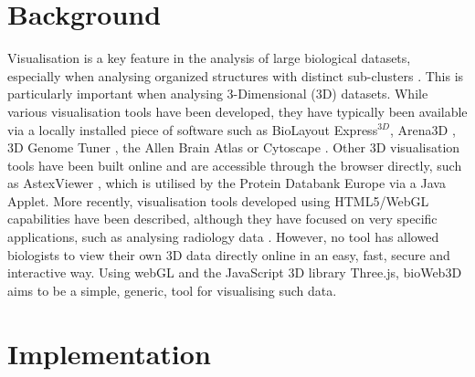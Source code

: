 \documentclass[10pt]{bmc_article}
\newenvironment{bmcformat}{\baselineskip20pt\sloppy\setboolean{publ}{false}}{\baselineskip20pt\sloppy}
\begin{document}
\begin{bmcformat}
\section{Background}

Visualisation is a key feature in the analysis of large biological datasets, especially when analysing organized structures with distinct sub-clusters \cite{Rubel10}. This is particularly important when analysing 3-Dimensional (3D) datasets. While various visualisation tools have been developed, they have typically been available via a locally installed piece of software such as BioLayout Express$^{3D}$\cite{Freeman07}, Arena3D \cite{Pavlopoulos08},  3D Genome Tuner \cite{Wang09}, the Allen Brain Atlas \cite{Lein07} or Cytoscape \cite{Shannon03}. Other 3D visualisation tools have been built online and are accessible through the browser directly, such as AstexViewer \cite{Hartshorn02}, which is utilised by the Protein Databank Europe via a Java Applet. More recently, visualisation tools developed using HTML5/WebGL capabilities have been described, although they have focused on very specific applications, such as analysing radiology data  \cite{Dinesh12}. However, no tool has allowed biologists to view their own 3D data directly online in an easy, fast, secure and interactive way. Using webGL and the JavaScript 3D library Three.js, bioWeb3D aims to be a simple, generic, tool for visualising such data.



\section{Implementation}


\end{bmcformat}
\end{document}
